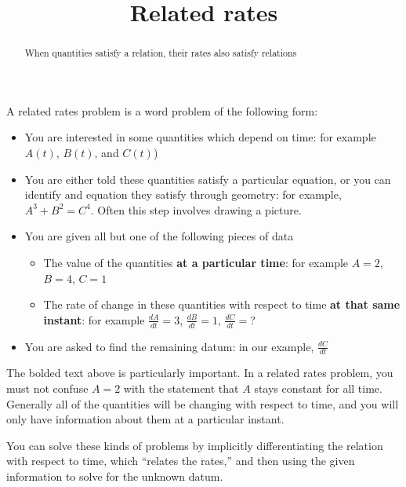 \documentclass{ximera}
\title{Related rates}
\begin{document}
\begin{abstract}
	When quantities satisfy a relation, their rates also satisfy
        relations
\end{abstract}

\maketitle



\begin{question}

\end{question}

A related rates problem is a word problem of the following form:

\begin{itemize}
\item You are interested in some quantities which depend on time: for
  example $A(t)$, $B(t)$, and $C(t)$)
\item You are either told these quantities satisfy a particular
  equation, or you can identify and equation they satisfy through
  geometry: for example, $A^3+B^2 = C^4$.  Often this step involves
  drawing a picture.
\item You are given all but one of the following pieces of data
	\begin{itemize}
	\item The value of the quantities \textbf{at a particular
          time}: for example $A=2$, $B=4$, $C=1$
	\item The rate of change in these quantities with respect to
          time \textbf{at that same instant}: for example
          $\frac{dA}{dt} = 3$, $\frac{dB}{dt} = 1$, $\frac{dC}{dt} =$?
	\end{itemize}
\item You are asked to find the remaining datum: in our example,
  $\frac{dC}{dt}$
\end{itemize}

The bolded text above is particularly important.  In a related rates
problem, you must not confuse $A=2$ with the statement that $A$ stays
constant for all time.  Generally all of the quantities will be
changing with respect to time, and you will only have information
about them at a particular instant.

You can solve these kinds of problems by implicitly differentiating
the relation with respect to time, which ``relates the rates,'' and then
using the given information to solve for the unknown datum.
\end{document}
